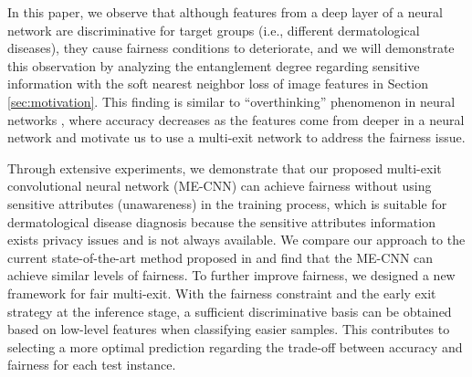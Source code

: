 
In this paper, we observe that although features from a deep layer of a neural network are discriminative for target groups (i.e., different dermatological diseases), they cause fairness conditions to deteriorate, and we will demonstrate this observation by analyzing the entanglement degree regarding sensitive information with the soft nearest neighbor loss \cite{frosst2019analyzing} of image features in Section \ref{sec:motivation}. This finding is similar to ``overthinking'' phenomenon in neural networks \cite{kaya2019shallow}, where accuracy decreases as the features come from deeper in a neural network and motivate us to use a multi-exit network \cite{kaya2019shallow,teerapittayanon2016branchynet} to address the fairness issue.


Through extensive experiments, we demonstrate that our proposed multi-exit convolutional neural network (ME-CNN) can achieve fairness without using sensitive attributes (unawareness) in the training process, which is suitable for dermatological disease diagnosis because the sensitive attributes information exists privacy issues and is not always available. We compare our approach to the current state-of-the-art method proposed in \cite{wu2022fairprune} and find that the ME-CNN can achieve similar levels of fairness. To further improve fairness, we designed a new framework for fair multi-exit. With the fairness constraint and the early exit strategy at the inference stage, a sufficient discriminative basis can be obtained based on low-level features when classifying easier samples. This contributes to selecting a more optimal prediction regarding the trade-off between accuracy and fairness for each test instance.

